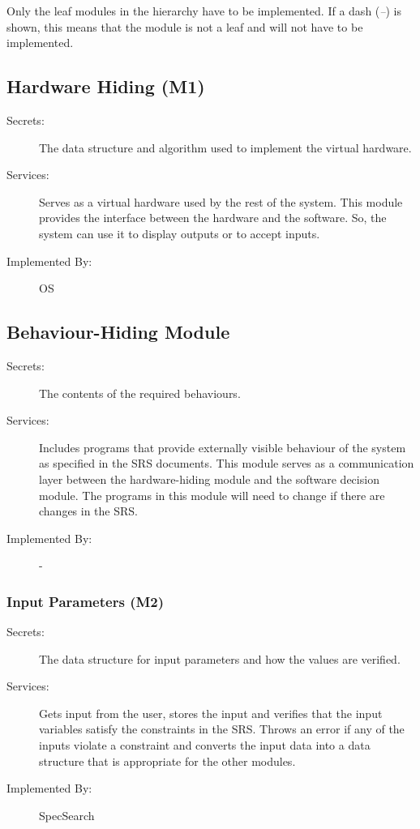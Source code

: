 \documentclass[12pt, titlepage]{article}
\begin{document}
	Only the leaf modules in the hierarchy have to be implemented. If a dash
	(\emph{--}) is shown, this means that the module is not a leaf and will not 
	have
	to be implemented.
	
	
	\subsection{Hardware Hiding (M1)} \label{M1}
	
	\begin{description}
		\item[Secrets:]The data structure and algorithm used to implement the 
		virtual
		hardware.
		\item[Services:]Serves as a virtual hardware used by the rest of the
		system. This module provides the interface between the hardware and the
		software. So, the system can use it to display outputs or to accept 
		inputs.
		\item[Implemented By:] OS
	\end{description}
	
	\subsection{Behaviour-Hiding Module }
	
	\begin{description}
		\item[Secrets:]The contents of the required behaviours.
		\item[Services:]Includes programs that provide externally visible 
		behaviour of
		the system as specified in the SRS
		documents. This module serves as a communication layer between the
		hardware-hiding module and the software decision module. The programs 
		in this
		module will need to change if there are changes in the SRS.
		\item[Implemented By:] -
	\end{description}
	
	\subsubsection{Input Parameters (M2)} \label{M2} 
	
	\begin{description}
		\item[Secrets:] The data structure for input parameters and how the 
		values 
		are verified. 
		\item[Services:] Gets input from the user, stores the input and 
		verifies 
		that 
		the input variables satisfy the constraints in the 
		SRS. Throws an error if 
		any of 
		the inputs violate a constraint and converts the input data into a data 
		structure that is 
		appropriate for the other 
		modules. 
		\item[Implemented By:]SpecSearch 
	\end{description} 
	
\end{document}
